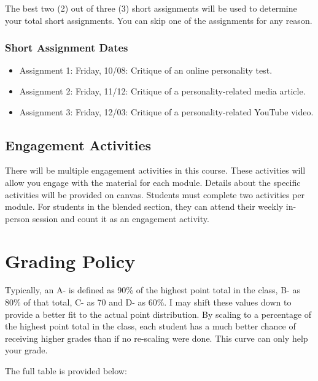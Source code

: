 The best two (2) out of three (3) short assignments will be used to determine your total short assignments. You can skip one of the assignments for any reason.

\hypertarget{short-assignment-dates}{%
\subsubsection*{Short Assignment Dates}\label{short-assignment-dates}}


\begin{itemize}
\item
  Assignment 1: Friday, 10/08: Critique of an online personality test.
\item
  Assignment 2: Friday, 11/12: Critique of a personality-related media article.
\item
  Assignment 3: Friday, 12/03: Critique of a personality-related YouTube video.
\end{itemize}

\hypertarget{engagement-activities}{%
\subsection*{Engagement Activities}\label{engagement-activities}}


There will be multiple engagement activities in this course. These activities will allow you engage with the material for each module. Details about the specific activities will be provided on canvas. Students must complete two activities per module. For students in the blended section, they can attend their weekly in-person session and count it as an engagement activity.

\hypertarget{grading-policy}{%
\section*{Grading Policy}\label{grading-policy}}


Typically, an A- is defined as 90\% of the highest point total in the class, B- as 80\% of that total, C- as 70 and D- as 60\%.
I may shift these values down to provide a better fit to the actual point distribution.
By scaling to a percentage of the highest point total in the class, each student has a much better chance of receiving higher grades than if no re-scaling were done.
This curve can only help your grade.

The full table is provided below:

